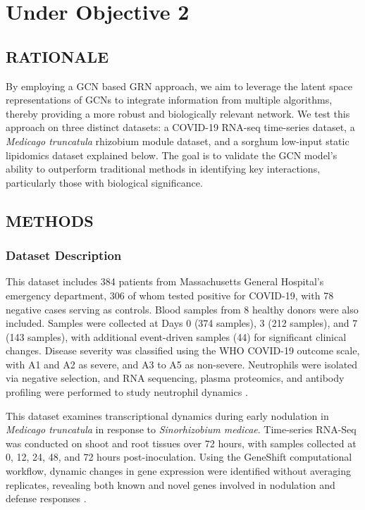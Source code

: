 \documentclass{article}
\newcounter{subsubsubsection}[subsubsection]
\begin{document}
\newpage
\section{Under Objective 2}
\subsection{RATIONALE}
By employing a GCN based GRN approach, we aim to leverage the latent space representations of GCNs to integrate information from multiple algorithms, thereby providing a more robust and biologically relevant network. We test this approach on three distinct datasets: a COVID-19 RNA-seq time-series dataset, a \textit{Medicago truncatula} rhizobium module dataset, and a sorghum low-input static lipidomics dataset explained below. The goal is to validate the GCN model’s ability to outperform traditional methods in identifying key interactions, particularly those with biological significance.

\subsection{METHODS}

\subsubsection{Dataset Description}

This dataset includes 384 patients from Massachusetts General Hospital's emergency department, 306 of whom tested positive for COVID-19, with 78 negative cases serving as controls. Blood samples from 8 healthy donors were also included. Samples were collected at Days 0 (374 samples), 3 (212 samples), and 7 (143 samples), with additional event-driven samples (44) for significant clinical changes. Disease severity was classified using the WHO COVID-19 outcome scale, with A1 and A2 as severe, and A3 to A5 as non-severe. Neutrophils were isolated via negative selection, and RNA sequencing, plasma proteomics, and antibody profiling were performed to study neutrophil dynamics \cite{covid}.

This dataset examines transcriptional dynamics during early nodulation in \textit{Medicago truncatula} in response to \textit{Sinorhizobium medicae}. Time-series RNA-Seq was conducted on shoot and root tissues over 72 hours, with samples collected at 0, 12, 24, 48, and 72 hours post-inoculation. Using the GeneShift computational workflow, dynamic changes in gene expression were identified without averaging replicates, revealing both known and novel genes involved in nodulation and defense responses \cite{medicago}.
\end{document}
